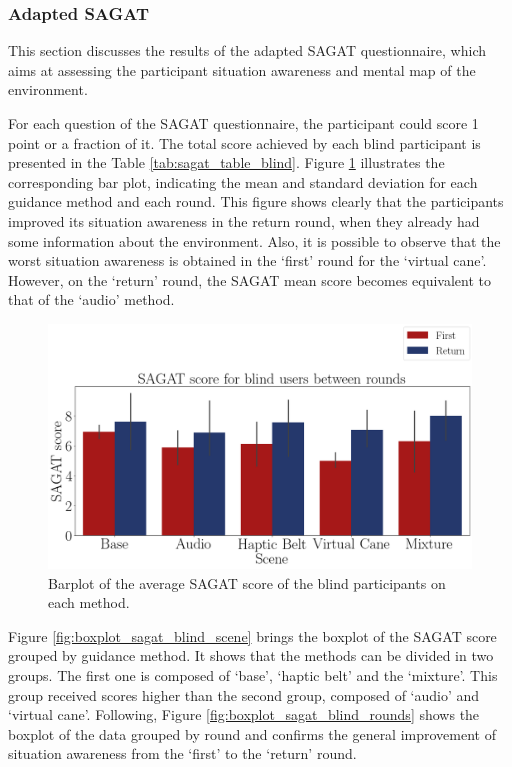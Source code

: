 \subsubsection{Adapted SAGAT}
\label{subsubsec:results_adapted_sagat_1}

This section discusses the results of the adapted SAGAT questionnaire, which aims at assessing the participant situation awareness and mental map of the environment. 

For each question of the SAGAT questionnaire, the participant could score 1 point or a fraction of it. The total score achieved by each blind participant is presented in the Table \ref{tab:sagat_table_blind}. Figure  \ref{fig:barplot_sagat_avg_5_scene_blind} illustrates the corresponding bar plot, indicating the mean and standard deviation for each guidance method and each round. This figure shows clearly that the participants improved its situation awareness in the return round, when they already had some information about the environment. Also, it is possible to observe that the worst situation awareness is obtained in the ‘first’ round for the ‘virtual cane’. However, on the ‘return’ round, the SAGAT mean score becomes equivalent to that of the ‘audio’ method.



\begin{figure}[!htb]
    \centering
    \includegraphics[width = 0.8\linewidth]{Resultados/Sagat/Figuras/png/barplot_sagat_avg_5_scene_blind.png}
    \caption{Barplot of the average SAGAT score of the blind participants on each method.}
    \label{fig:barplot_sagat_avg_5_scene_blind}
\end{figure}

Figure \ref{fig:boxplot_sagat_blind_scene} brings the boxplot of the SAGAT score grouped by guidance method. It shows that the methods can be divided in two groups. The first one is composed of ‘base’, ‘haptic belt’ and the ‘mixture’. This group received scores higher than the second group, composed of ‘audio’ and ‘virtual cane’. Following, Figure \ref{fig:boxplot_sagat_blind_rounds} shows the boxplot of the data grouped by round and confirms the general improvement of situation awareness from the ‘first’ to the ‘return’ round. 

